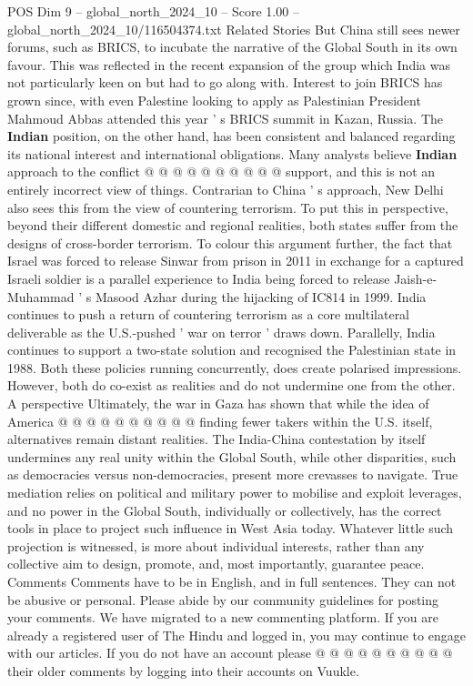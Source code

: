 \begin{textsample}{POS Dim 9 – global\_north\_2024\_10 – Score 1.00 – global\_north\_2024\_10/116504374.txt}
Related Stories But China still sees newer forums, such as BRICS, to incubate the narrative of the Global South in its own favour.
This was reflected in the recent expansion of the group which India was not particularly keen on but had to go along with.
Interest to join BRICS has grown since, with even Palestine looking to apply as Palestinian President Mahmoud Abbas attended this year ' s BRICS summit in Kazan, Russia.
The \textbf{Indian} position, on the other hand, has been consistent and balanced regarding its national interest and international obligations.
Many analysts believe \textbf{Indian} approach to the conflict @ @ @ @ @ @ @ @ @ @ support, and this is not an entirely incorrect view of things.
Contrarian to China ' s approach, New Delhi also sees this from the view of countering terrorism.
To put this in perspective, beyond their different domestic and regional realities, both states suffer from the designs of cross-border terrorism.
To colour this argument further, the fact that Israel was forced to release Sinwar from prison in 2011 in exchange for a captured Israeli soldier is a parallel experience to India being forced to release Jaish-e-Muhammad ' s Masood Azhar during the hijacking of IC814 in 1999.
India continues to push a return of countering terrorism as a core multilateral deliverable as the U.S.-pushed ' war on terror ' draws down.
Parallelly, India continues to support a two-state solution and recognised the Palestinian state in 1988.
Both these policies running concurrently, does create polarised impressions.
However, both do co-exist as realities and do not undermine one from the other.
A perspective Ultimately, the war in Gaza has shown that while the idea of America @ @ @ @ @ @ @ @ @ @ finding fewer takers within the U.S. itself, alternatives remain distant realities.
The India-China contestation by itself undermines any real unity within the Global South, while other disparities, such as democracies versus non-democracies, present more crevasses to navigate.
True mediation relies on political and military power to mobilise and exploit leverages, and no power in the Global South, individually or collectively, has the correct tools in place to project such influence in West Asia today.
Whatever little such projection is witnessed, is more about individual interests, rather than any collective aim to design, promote, and, most importantly, guarantee peace.
Comments Comments have to be in English, and in full sentences.
They can not be abusive or personal.
Please abide by our community guidelines for posting your comments.
We have migrated to a new commenting platform.
If you are already a registered user of The Hindu and logged in, you may continue to engage with our articles.
If you do not have an account please @ @ @ @ @ @ @ @ @ @ their older comments by logging into their accounts on Vuukle.

\end{textsample}
